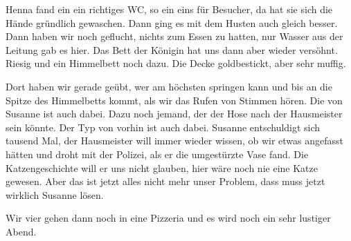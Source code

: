 Henna fand ein ein richtiges WC, so ein eins für Besucher, da hat sie sich die Hände gründlich gewaschen. Dann ging es mit dem Husten auch gleich besser. Dann haben wir noch geflucht, nichts zum Essen zu hatten, nur Wasser aus der Leitung gab es hier. Das Bett der Königin hat uns dann aber wieder versöhnt. Riesig und ein Himmelbett noch dazu. Die Decke goldbestickt, aber sehr muffig. 

Dort haben wir gerade geübt, wer am höchsten springen kann und bis an die Spitze des Himmelbetts kommt, als wir das Rufen von Stimmen hören. Die von Susanne ist auch dabei. Dazu noch jemand, der der Hose nach der Hausmeister sein könnte. Der Typ von vorhin ist auch dabei. Susanne entschuldigt sich tausend Mal, der Hausmeister will immer wieder wissen, ob wir etwas angefasst hätten und droht mit der Polizei, als er die umgestürzte Vase fand. Die Katzengeschichte will er uns nicht glauben, hier wäre noch nie eine Katze gewesen. Aber das ist jetzt alles nicht mehr unser Problem, dass muss jetzt wirklich Susanne lösen.

Wir vier gehen dann noch in eine Pizzeria und es wird noch ein sehr lustiger Abend. \hfill {\color{red}\decofourleft}




